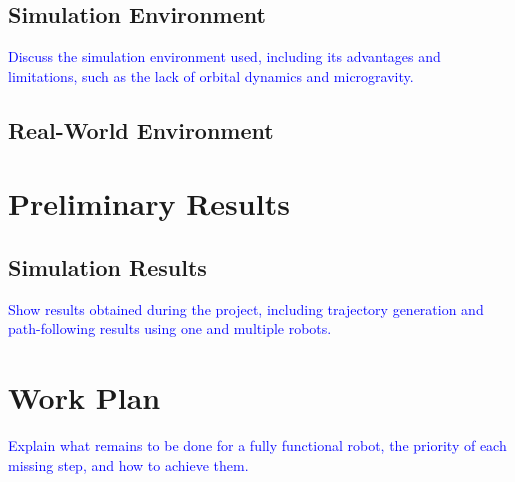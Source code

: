 \documentclass[a4paper, oneside]{article}
\begin{document}
    \subsection{Simulation Environment}
\textcolor{blue}{Discuss the simulation environment used, including its advantages and limitations, such as the lack of orbital dynamics and microgravity.}



\subsection{Real-World Environment}


\clearpage
\section{Preliminary Results}

\subsection{Simulation Results}
\textcolor{blue}{Show results obtained during the project, including trajectory generation and path-following results using one and multiple robots.}

\clearpage
\section{Work Plan}
\textcolor{blue}{Explain what remains to be done for a fully functional robot, the priority of each missing step, and how to achieve them.}

\nocite{*} %
\printbibliography[heading=bibintoc]

\appendix
\end{document}
